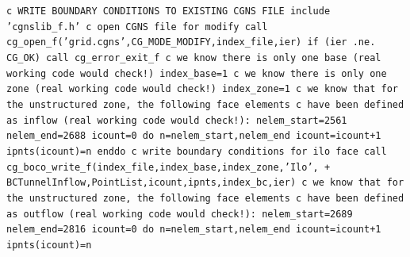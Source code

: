 \documentclass[12pt]{article}
\begin{document}
{\tt \noindent c  WRITE BOUNDARY CONDITIONS TO EXISTING CGNS FILE
\newline\indent      include 'cgnslib\_f.h'
\newline c  open CGNS file for modify
\newline\indent      call cg\_open\_f('grid.cgns',CG\_MODE\_MODIFY,index\_file,ier)
\newline\indent      if (ier .ne. CG\_OK) call cg\_error\_exit\_f
\newline c  we know there is only one base (real working code would check!)
\newline\indent      index\_base=1
\newline c  we know there is only one zone (real working code would check!)
\newline\indent      index\_zone=1
\newline c  we know that for the unstructured zone, the following face elements
\newline c  have been defined as inflow (real working code would check!):
\newline\indent      nelem\_start=2561
\newline\indent      nelem\_end=2688
\newline\indent      icount=0
\newline\indent      do n=nelem\_start,nelem\_end
\newline\indent\indent        icount=icount+1
\newline\indent\indent        ipnts(icount)=n
\newline\indent      enddo
\newline c  write boundary conditions for ilo face
\newline\indent      call cg\_boco\_write\_f(index\_file,index\_base,index\_zone,'Ilo',
\newline + \indent BCTunnelInflow,PointList,icount,ipnts,index\_bc,ier)
\newline c  we know that for the unstructured zone, the following face elements
\newline c  have been defined as outflow (real working code would check!):
\newline\indent      nelem\_start=2689
\newline\indent      nelem\_end=2816
\newline\indent      icount=0
\newline\indent      do n=nelem\_start,nelem\_end
\newline\indent\indent        icount=icount+1
\newline\indent\indent        ipnts(icount)=n
}
\end{document}
